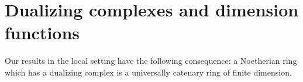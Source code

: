 \section{Dualizing complexes and dimension functions}
\label{section-dimension-function}

\noindent
Our results in the local setting have the following consequence:
a Noetherian ring which has a dualizing complex is a
universally catenary ring of finite dimension.


